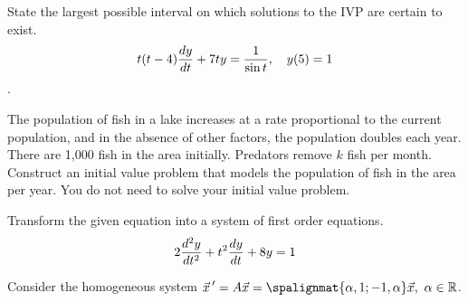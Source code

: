 \documentclass[12pt]{exam}
\begin{document}
\begin{questions}
\begin{parts}
    \end{parts}
    
    \newpage
    
    \question[2] %
    State the largest possible interval on which solutions to the IVP are certain to exist. $$t(t-4) {\frac{dy}{dt}} + 7t y = \frac{1}{\sin t}, \quad y(5) = 1$$.    \vspace{3cm}
    
    \question[3] %
    The population of fish in a lake increases at a rate proportional to the current population, and in the absence of other factors, the population doubles each year. There are 1,000 fish in the area initially. Predators remove $k$ fish per month. Construct an initial value problem that models the population of fish in the area per year. You do not need to solve your initial value problem. 
    \vspace{4cm}
    
    \question[3] %
    Transform the given equation into a system of first order equations. 
    $$2{\frac{d ^2y}{dt^2}} + t^2{\frac{dy}{dt}} +8y = 1$$
    
    \vspace{3cm}
    

    

    
    \newpage 
    

    
    \newpage
    
    \question[5] %
    Consider the homogeneous system $\displaystyle \vec x \, ' = A \vec x = \spalignmat{\alpha, 1;-1, \alpha}\vec x, \ \alpha \in \mathbb R$. 
    

\end{questions}
\end{document}
